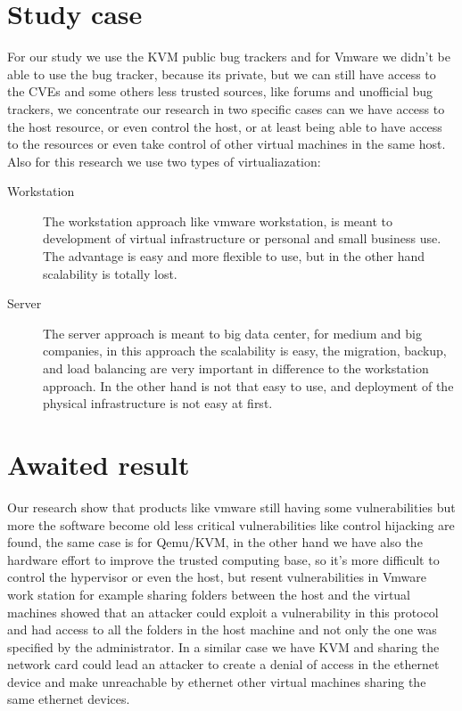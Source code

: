 \section{Study case}

For our study we use the KVM public bug trackers and for Vmware we didn't be able
to use the bug tracker, because its private, but we can still have access to the CVEs
and some others less trusted sources, like forums and unofficial bug trackers,
we concentrate our research in two specific cases can we have access to the host
resource, or even control the host, or at least being able to have access to the resources
or even take control of other virtual machines in the same host.
Also for this research we use two types of virtualiazation:
\begin{description}
\item[Workstation] The workstation approach like vmware workstation, is meant 
to development of virtual infrastructure or personal and small business use. The advantage 
is easy and more flexible to use, but in the other hand scalability is totally lost.
\item[Server] The server approach is meant to big data center, for medium and big companies,
in this approach the scalability is easy, the migration, backup, and load balancing are very important
in difference to the workstation approach. In the other hand is not that easy to use, and deployment
of the physical infrastructure is not easy at first.
\end{description}

\section{Awaited result}

Our research show that products like vmware still having some vulnerabilities but 
more the software become old less critical vulnerabilities like control hijacking are found,
the same case is for Qemu/KVM, in the other hand we have also the hardware effort to
improve the trusted computing base, so it's more difficult to control the hypervisor or even
the host, but resent vulnerabilities in Vmware work station for example sharing folders
between the host and the virtual machines showed that an attacker could exploit a vulnerability
in this protocol and had access to all the folders in the host machine and not only the one was
specified by the administrator.
In a similar case we have KVM and sharing the network card could lead an attacker to create
a denial of access in the ethernet device and make unreachable by ethernet other virtual machines
sharing the same ethernet devices. 
